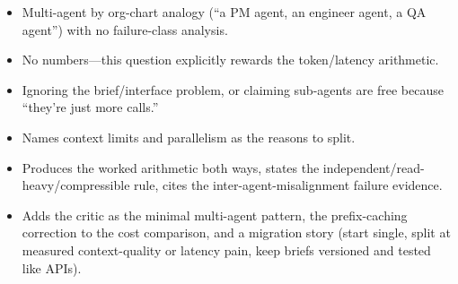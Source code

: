 \begin{interviewq}
\redflags
\begin{itemize}
    \item Multi-agent by org-chart analogy (``a PM agent, an engineer agent, a QA agent'') with no failure-class analysis.
    \item No numbers---this question explicitly rewards the token/latency arithmetic.
    \item Ignoring the brief/interface problem, or claiming sub-agents are free because ``they're just more calls.''
\end{itemize}


\goodgreat
\begin{itemize}
    \item {} Names context limits and parallelism as the reasons to split.
    \item {} Produces the worked arithmetic both ways, states the independent/read-heavy/compressible rule, cites the inter-agent-misalignment failure evidence.
    \item {} Adds the critic as the minimal multi-agent pattern, the prefix-caching correction to the cost comparison, and a migration story (start single, split at measured context-quality or latency pain, keep briefs versioned and tested like APIs).
\end{itemize}

\end{interviewq}


